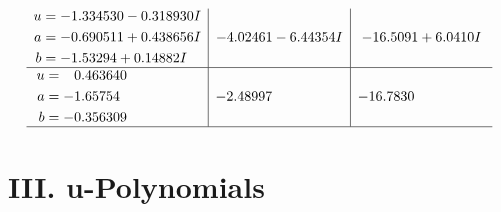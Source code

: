 \documentclass[1p]{elsarticle_modified}
\theoremstyle{definition}
\begin{document}
$$\begin{array}{c|c|c}
\begin{aligned}
u &= -1.334530 - 0.318930 I \\
a &= -0.690511 + 0.438656 I \\
b &= -1.53294 + 0.14882 I\end{aligned}
 & -4.02461 - 6.44354 I & -16.5091 + 6.0410 I \\ \hline\begin{aligned}
u &= \phantom{-}0.463640\phantom{ +0.000000I} \\
a &= -1.65754\phantom{ +0.000000I} \\
b &= -0.356309\phantom{ +0.000000I}\end{aligned}
 & -2.48997\phantom{ +0.000000I} & -16.7830\phantom{ +0.000000I}\\
 \hline 
 \end{array}$$\newpage
\newpage\renewcommand{\arraystretch}{1}
\centering \section*{ III. u-Polynomials}
\end{document}
